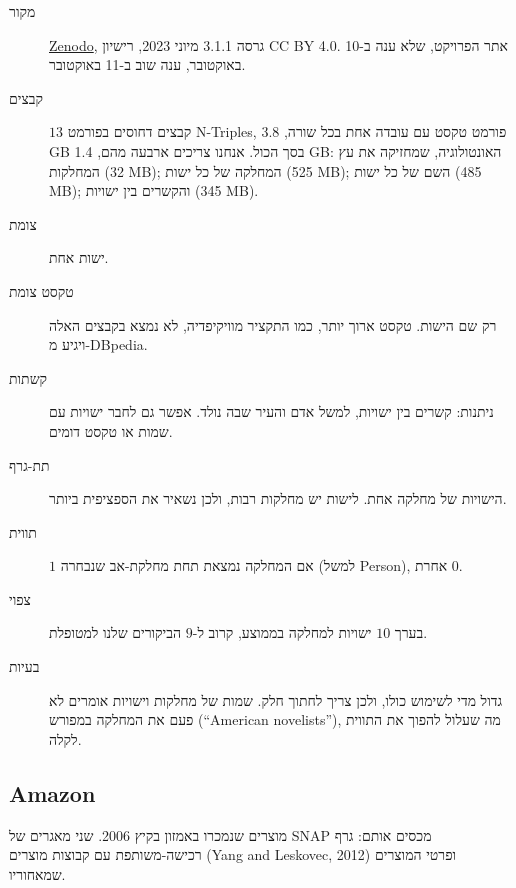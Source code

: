 \documentclass[11pt]{article}
\newcommand{\en}[1]{\foreignlanguage{english}{#1}}
\begin{document}
\begin{description}
\item[מקור] \href{https://doi.org/10.5281/zenodo.8068322}{\en{Zenodo}}, גרסה \en{3.1.1} מיוני 2023,
רישיון \en{CC BY 4.0}. אתר הפרויקט, שלא ענה ב-10 באוקטובר, ענה שוב ב-11 באוקטובר.
\item[קבצים] $13$ קבצים דחוסים בפורמט \en{N-Triples}, פורמט טקסט עם עובדה אחת בכל שורה,
\en{3.8 GB} בסך הכול. אנחנו צריכים ארבעה מהם, \en{1.4 GB}: האונטולוגיה, שמחזיקה את עץ המחלקות
(\en{32 MB}); המחלקה של כל ישות (\en{525 MB}); השם של כל ישות (\en{485 MB}); והקשרים בין ישויות
(\en{345 MB}).
\item[צומת] ישות אחת.
\item[טקסט צומת] רק שם הישות. טקסט ארוך יותר, כמו התקציר מוויקיפדיה, לא נמצא בקבצים האלה ויגיע
מ-\en{DBpedia}.
\item[קשתות] ניתנות: קשרים בין ישויות, למשל אדם והעיר שבה נולד. אפשר גם לחבר ישויות עם שמות או
טקסט דומים.
\item[תת-גרף] הישויות של מחלקה אחת. לישות יש מחלקות רבות, ולכן נשאיר את הספציפית ביותר.
\item[תווית] $1$ אם המחלקה נמצאת תחת מחלקת-אב שנבחרה (למשל \en{Person}), אחרת $0$.
\item[צפוי] בערך $10$ ישויות למחלקה בממוצע, קרוב ל-$9$ הביקורים שלנו למטופלת.
\item[בעיות] גדול מדי לשימוש כולו, ולכן צריך לחתוך חלק. שמות של מחלקות וישויות אומרים לא פעם
את המחלקה במפורש (\en{``American novelists''}), מה שעלול להפוך את התווית לקלה.
\end{description}

\subsection*{\en{Amazon}}

מוצרים שנמכרו באמזון בקיץ 2006. שני מאגרים של \en{SNAP} מכסים אותם: גרף רכישה-משותפת עם קבוצות
מוצרים (\en{Yang and Leskovec, 2012}) ופרטי המוצרים שמאחוריו.
\end{document}
